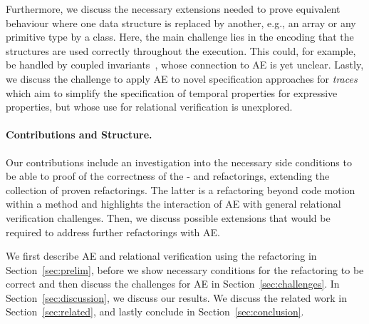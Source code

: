 Furthermore, we discuss the necessary extensions needed to prove equivalent behaviour where one data structure is replaced by another, e.g., an array or any primitive type by a class.
Here, the main challenge lies in the encoding that the structures are used correctly throughout the execution.
This could, for example, be handled by coupled invariants~\cite{DBLP:conf/birthday/BeckertU18}, whose connection to AE is yet unclear. 
Lastly, we discuss the challenge to apply AE to novel specification approaches for \emph{traces} which aim to simplify the specification of temporal properties for expressive properties, but whose use for relational verification is unexplored.

\paragraph{Contributions and Structure.}
Our contributions include an investigation into the necessary side conditions to be able to proof of the correctness of the - and  refactorings, extending the collection of proven refactorings.
The latter is a refactoring beyond code motion within a method and highlights the interaction of AE with general relational verification challenges.
Then, we discuss possible extensions that would be required to address further refactorings with AE.

We first describe AE and relational verification using the  refactoring in Section~\ref{sec:prelim}, before we show necessary conditions for the  refactoring to be correct  and then discuss the challenges for AE in Section~\ref{sec:challenges}.
In Section~\ref{sec:discussion}, we discuss our results. We discuss the related work in  Section~\ref{sec:related}, and lastly conclude in Section~\ref{sec:conclusion}.



